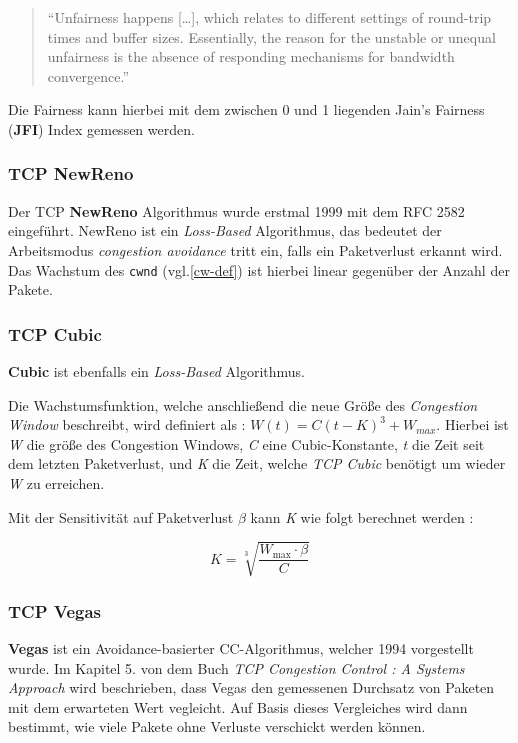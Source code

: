 \documentclass[paper=a4,fontsize=12pt,ngerman]{scrartcl}
\begin{document}

\begin{quote}
``Unfairness happens [\dots], which relates to different settings of round-trip times and buffer sizes.
Essentially, the reason for the unstable or unequal unfairness is the absence of responding mechanisms for bandwidth convergence.''\cite{tang24BBRns3}
\end{quote}
 

Die Fairness kann hierbei mit dem zwischen 0 und 1 liegenden Jain's Fairness (\textbf{JFI}) Index gemessen werden.\cite{DBLP:journals/corr/cs-NI-9809099}

\subsubsection{TCP NewReno}
Der TCP \textbf{NewReno} Algorithmus wurde erstmal 1999 mit dem RFC 2582 eingeführt.\cite{rfc2582}
NewReno ist ein \textit{Loss-Based} Algorithmus, das bedeutet der
Arbeitsmodus \textit{congestion avoidance} tritt ein, falls ein Paketverlust erkannt wird.
Das Wachstum des \texttt{cwnd} (vgl.\ref{cw-def})  ist hierbei linear gegenüber der Anzahl der Pakete.


\subsubsection{TCP Cubic}
\textbf{Cubic} ist ebenfalls ein \textit{Loss-Based} Algorithmus.

Die Wachstumsfunktion, welche anschließend die neue Größe des \textit{Congestion Window}
beschreibt, wird definiert als : $ W(t) = C(t-K)^3 + W_{max}$.  
Hierbei ist \textit{W} die größe des Congestion Windows, \textit{C} eine Cubic-Konstante, 
\textit{t} die Zeit seit dem letzten Paketverlust, und \textit{K} die Zeit, welche \textit{TCP Cubic} benötigt 
um wieder \textit{W} zu erreichen.

Mit der Sensitivität auf Paketverlust $\beta$ kann \textit{K} wie folgt berechnet werden \cite{HArheeInjXuCUBIC} :

\[
K = \sqrt[3]{\frac{W_{\text{max}} \cdot \beta}{C}}     
\]


\subsubsection{TCP Vegas}
\textbf{Vegas} ist ein Avoidance-basierter CC-Algorithmus, welcher 1994 vorgestellt wurde.
Im Kapitel 5. von dem Buch \textit{TCP Congestion Control : A Systems Approach} wird beschrieben, dass Vegas den gemessenen Durchsatz 
von Paketen mit dem erwarteten Wert vegleicht. \cite{tcpccCh5}
Auf Basis dieses Vergleiches wird dann bestimmt, wie viele Pakete ohne Verluste verschickt werden können.
\end{document}
